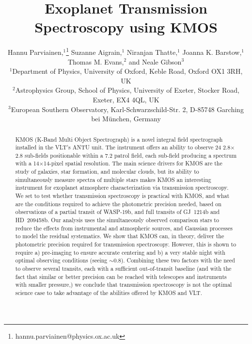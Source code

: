 \documentclass[useAMS,usenatbib]{mn2e}
\begin{document}
\title{Exoplanet Transmission Spectroscopy using KMOS}

\author[H. Parviainen et al.]{Hannu Parviainen,$^1$\thanks{hannu.parviainen@physics.ox.ac.uk} Suzanne Aigrain,$^1$
Niranjan Thatte,$^1$ \newauthor Joanna K. Barstow,$^1$ Thomas M. Evans,$^2$ and Neale Gibson$^3$\\
$^1$Department of Physics, University of Oxford, Keble Road, Oxford OX1 3RH, UK\\
$^2$Astrophysics Group, School of Physics, University of Exeter, Stocker Road, Exeter, EX4 4QL, UK\\
$^3$European Southern Observatory, Karl-Schwarzschild-Str. 2, D-85748 Garching bei M\"unchen, Germany}

\maketitle

\begin{abstract}
KMOS (K-Band Multi Object Spectrograph) is a novel integral field spectrograph installed in the VLT's ANTU
unit. The instrument offers an ability to observe 24 2.8\arcsec{}$\times$2.8\arcsec{} sub-fields positionable within a
7.2\arcmin{} patrol field, each sub-field producing a spectrum with a 14$\times$14-pixel spatial resolution. The main
science drivers for KMOS are the study of galaxies, star formation, and molecular clouds, but its ability to
simultaneously measure spectra of multiple stars makes KMOS an interesting instrument for exoplanet atmosphere
characterization via transmission spectroscopy. We set to test whether transmission spectroscopy is practical with KMOS,
and what are the conditions required to achieve the photometric precision needed, based on observations of a partial
transit of WASP-19b, and full transits of GJ~1214b and HD~209458b. Our analysis uses the simultaneously
observed comparison stars to reduce the effects from instrumental and atmospheric sources, and Gaussian processes to
model the residual systematics. We show that KMOS can, in theory, deliver the photometric precision required for
transmission spectroscopy. However, this is shown to require a) pre-imaging to ensure accurate centering and b) a very
stable night with optimal observing conditions (seeing $\sim$0.8\arcsec{}). Combining these two factors with the need to
observe several transits, each with a sufficient out-of-transit baseline (and with the fact that similar or better
precision can be reached with telescopes and instruments with smaller pressure,) we conclude that transmission
spectroscopy is not the optimal science case to take advantage of the abilities offered by KMOS and VLT.
\end{abstract}
\end{document}
